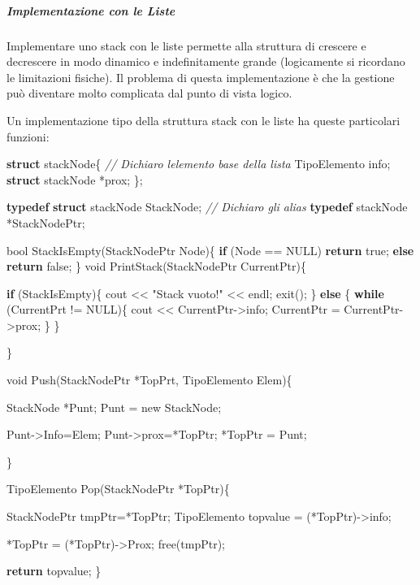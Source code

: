 \documentclass[
]{article}
\newenvironment{Shaded}{}{}
\newcommand{\CommentTok}[1]{\textcolor[rgb]{0.38,0.63,0.69}{\textit{#1}}}
\newcommand{\ControlFlowTok}[1]{\textcolor[rgb]{0.00,0.44,0.13}{\textbf{#1}}}
\newcommand{\DataTypeTok}[1]{\textcolor[rgb]{0.56,0.13,0.00}{#1}}
\newcommand{\KeywordTok}[1]{\textcolor[rgb]{0.00,0.44,0.13}{\textbf{#1}}}
\newcommand{\NormalTok}[1]{#1}
\newcommand{\StringTok}[1]{\textcolor[rgb]{0.25,0.44,0.63}{#1}}
\begin{document}
\hypertarget{header-n1365}{%
\subparagraph{\texorpdfstring{Implementazione con le
\emph{Liste}}{Implementazione con le Liste}}\label{header-n1365}}

Implementare uno stack con le liste permette alla struttura di crescere
e decrescere in modo dinamico e indefinitamente grande (logicamente si
ricordano le limitazioni fisiche). Il problema di questa implementazione
è che la gestione può diventare molto complicata dal punto di vista
logico.

Un implementazione tipo della struttura stack con le liste ha queste
particolari funzioni:

\begin{Shaded}
\begin{Highlighting}[]
\KeywordTok{struct}\NormalTok{ stackNode\{			}\CommentTok{// Dichiaro l\textquotesingle{}elemento base della lista}
\NormalTok{    TipoElemento info;}
    \KeywordTok{struct}\NormalTok{ stackNode *prox;}
\NormalTok{\};}

\KeywordTok{typedef} \KeywordTok{struct}\NormalTok{ stackNode StackNode;	}\CommentTok{// Dichiaro gli alias }
\KeywordTok{typedef}\NormalTok{ stackNode *StackNodePtr;}

\DataTypeTok{bool}\NormalTok{ StackIsEmpty(StackNodePtr Node)\{}
    \ControlFlowTok{if}\NormalTok{ (Node == NULL) }\ControlFlowTok{return}\NormalTok{ true;}
    \ControlFlowTok{else} \ControlFlowTok{return}\NormalTok{ false;}
\NormalTok{\}}
\DataTypeTok{void}\NormalTok{ PrintStack(StackNodePtr CurrentPtr)\{}
    
    \ControlFlowTok{if}\NormalTok{ (StackIsEmpty)\{}
\NormalTok{        cout \textless{}\textless{} }\StringTok{"Stack vuoto!"}\NormalTok{ \textless{}\textless{} endl;}
\NormalTok{        exit();}
\NormalTok{    \} }\ControlFlowTok{else}\NormalTok{ \{}
        \ControlFlowTok{while}\NormalTok{ (CurrentPrt != NULL)\{}
\NormalTok{            cout \textless{}\textless{} CurrentPtr{-}\textgreater{}info;}
\NormalTok{            CurrentPtr = CurrentPtr{-}\textgreater{}prox;}
\NormalTok{        \}}
\NormalTok{    \}}
   
\NormalTok{\}}

\DataTypeTok{void}\NormalTok{ Push(StackNodePtr *TopPrt, TipoElemento Elem)\{}
    
\NormalTok{    StackNode *Punt;}
\NormalTok{    Punt = new StackNode;}
    
\NormalTok{    Punt{-}\textgreater{}Info=Elem;}
\NormalTok{    Punt{-}\textgreater{}prox=*TopPtr;}
\NormalTok{    *TopPtr = Punt;}
      
\NormalTok{\}}

\NormalTok{TipoElemento Pop(StackNodePtr *TopPtr)\{}
    
\NormalTok{    StackNodePtr tmpPtr=*TopPtr;}
\NormalTok{    TipoElemento topvalue = (*TopPtr){-}\textgreater{}info;}
    
\NormalTok{    *TopPtr = (*TopPtr){-}\textgreater{}Prox;}
\NormalTok{    free(tmpPtr);}
    
    \ControlFlowTok{return}\NormalTok{ topvalue;}
\NormalTok{\}}
\end{Highlighting}
\end{Shaded}
\end{document}
